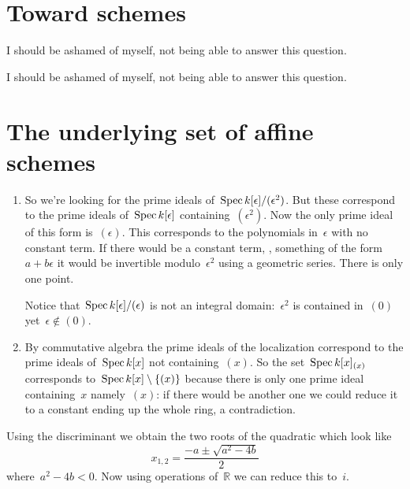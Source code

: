 \section{Toward schemes}

\begin{exercise} %
  I should be ashamed of myself, not being able to answer this question.
\end{exercise}

\begin{exercise} %
  I should be ashamed of myself, not being able to answer this question.
\end{exercise}


\section{The underlying set of affine schemes}

\begin{exercise}
  \label{exercise:42a}
  \begin{enumerate}
    \item\label{enumerate:42a-a} So we're looking for the prime ideals of~$\operatorname{Spec} k[\epsilon]/(\epsilon^2)$. But these correspond to the prime ideals of~$\operatorname{Spec} k[\epsilon]$ containing~$(\epsilon^2)$. Now the only prime ideal of this form is~$(\epsilon)$. This corresponds to the polynomials in~$\epsilon$ with no constant term. If there would be a constant term, \ie, something of the form~$a+b\epsilon$ it would be invertible modulo~$\epsilon^2$ using a geometric series. There is only one point.

      Notice that~$\operatorname{Spec} k[\epsilon]/(\epsilon)$ is not an integral domain:~$\epsilon^2$ is contained in~$(0)$ yet~$\epsilon\notin(0)$.

    \item\label{enumerate:42a-b} By commutative algebra the prime ideals of the localization correspond to the prime ideals of~$\operatorname{Spec} k[x]$ not containing~$(x)$. So the set~$\operatorname{Spec} k[x]_{(x)}$ corresponds to~$\operatorname{Spec} k[x]\setminus\left\{ (x) \right\}$ because there is only one prime ideal containing~$x$ namely~$(x)$: if there would be another one we could reduce it to a constant ending up the whole ring, a contradiction.
  \end{enumerate}
\end{exercise}

\begin{exercise}
  Using the discriminant we obtain the two roots of the quadratic which look like
  \begin{equation}
    x_{1,2}=\frac{-a\pm\sqrt{a^2-4b}}{2}
  \end{equation}
  where~$a^2-4b<0$. Now using operations of~$\mathbb{R}$ we can reduce this to~$i$.
\end{exercise}

